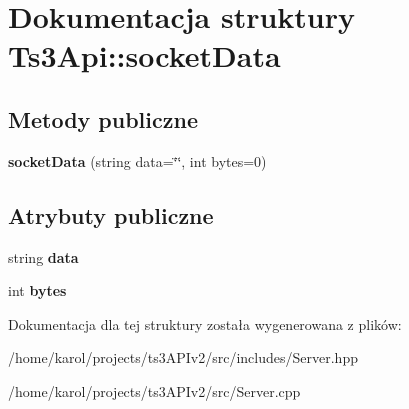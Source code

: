 \hypertarget{struct_ts3_api_1_1socket_data}{}\section{Dokumentacja struktury Ts3\+Api\+:\+:socket\+Data}
\label{struct_ts3_api_1_1socket_data}
\subsection*{Metody publiczne}
\begin{DoxyCompactItemize}
\item 
{\bfseries socket\+Data} (string data=\char`\"{}\char`\"{}, int bytes=0)\hypertarget{struct_ts3_api_1_1socket_data_a3184c40186a2ce6aabc28e2c33e1cc2d}{}\label{struct_ts3_api_1_1socket_data_a3184c40186a2ce6aabc28e2c33e1cc2d}

\end{DoxyCompactItemize}
\subsection*{Atrybuty publiczne}
\begin{DoxyCompactItemize}
\item 
string {\bfseries data}\hypertarget{struct_ts3_api_1_1socket_data_a63473d0fbca6614e92d80b1efde51937}{}\label{struct_ts3_api_1_1socket_data_a63473d0fbca6614e92d80b1efde51937}

\item 
int {\bfseries bytes}\hypertarget{struct_ts3_api_1_1socket_data_a0d901390d3949289f84a3bf37591454d}{}\label{struct_ts3_api_1_1socket_data_a0d901390d3949289f84a3bf37591454d}

\end{DoxyCompactItemize}


Dokumentacja dla tej struktury została wygenerowana z plików\+:\begin{DoxyCompactItemize}
\item 
/home/karol/projects/ts3\+A\+P\+Iv2/src/includes/Server.\+hpp\item 
/home/karol/projects/ts3\+A\+P\+Iv2/src/Server.\+cpp\end{DoxyCompactItemize}
